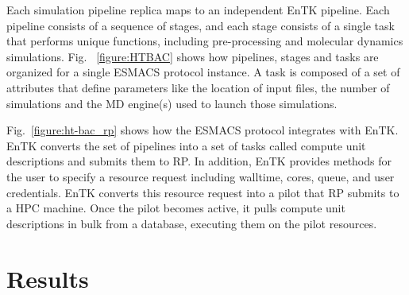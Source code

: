 \documentclass{bmcart}
\def\texttt{[image: ]}
\begin{document}
Each simulation pipeline replica maps to an independent EnTK pipeline. Each
pipeline consists of a sequence of stages, and each stage consists of a single
task that performs unique functions, including pre-processing and molecular
dynamics simulations. Fig. ~\ref{figure:HTBAC} shows how pipelines, stages and
tasks are organized for a single ESMACS protocol instance. A task is composed of a set of attributes that define parameters like the location of input files, the number of simulations and the MD engine(s) used to launch those simulations.






Fig.~\ref{figure:ht-bac_rp} shows how the ESMACS protocol integrates with
EnTK\@. EnTK converts the set of pipelines into a set of tasks called compute
unit descriptions and submits them to RP\@. In addition, EnTK provides
methods for the user to specify a resource request including walltime, cores,
queue, and user credentials. EnTK converts this resource request into a pilot
that RP submits to a HPC machine. Once the pilot becomes active, it pulls
compute unit descriptions in bulk from a database, executing them on the
pilot resources.


\section{Results}\label{sec:3}
\end{document}
